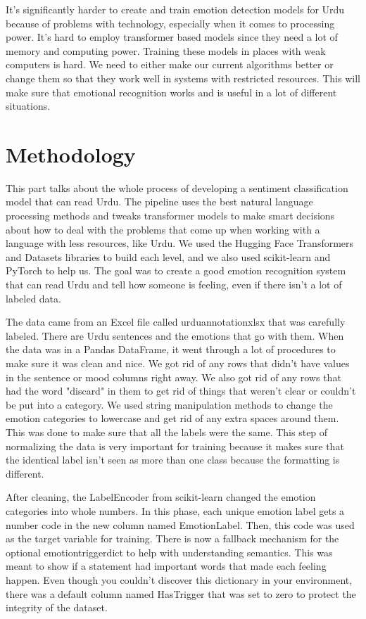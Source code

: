 \documentclass[12pt]{article}
\begin{document}
It's significantly harder to create and train emotion detection models for Urdu because of problems with technology, especially when it comes to processing power. It's hard to employ transformer based models since they need a lot of memory and computing power. Training these models in places with weak computers is hard. We need to either make our current algorithms better or change them so that they work well in systems with restricted resources. This will make sure that emotional recognition works and is useful in a lot of different situations.

\section{Methodology}

This part talks about the whole process of developing a sentiment classification model that can read Urdu. The pipeline uses the best natural language processing methods and tweaks transformer models to make smart decisions about how to deal with the problems that come up when working with a language with less resources, like Urdu. We used the Hugging Face Transformers and Datasets libraries to build each level, and we also used scikit-learn and PyTorch to help us. The goal was to create a good emotion recognition system that can read Urdu and tell how someone is feeling, even if there isn't a lot of labeled data.

The data came from an Excel file called urduannotationxlsx that was carefully labeled. There are Urdu sentences and the emotions that go with them. When the data was in a Pandas DataFrame, it went through a lot of procedures to make sure it was clean and nice. We got rid of any rows that didn't have values in the sentence or mood columns right away. We also got rid of any rows that had the word "discard" in them to get rid of things that weren't clear or couldn't be put into a category. We used string manipulation methods to change the emotion categories to lowercase and get rid of any extra spaces around them. This was done to make sure that all the labels were the same. This step of normalizing the data is very important for training because it makes sure that the identical label isn't seen as more than one class because the formatting is different.

After cleaning, the LabelEncoder from scikit-learn changed the emotion categories into whole numbers. In this phase, each unique emotion label gets a number code in the new column named EmotionLabel. Then, this code was used as the target variable for training. There is now a fallback mechanism for the optional emotiontriggerdict to help with understanding semantics. This was meant to show if a statement had important words that made each feeling happen. Even though you couldn't discover this dictionary in your environment, there was a default column named HasTrigger that was set to zero to protect the integrity of the dataset.
\end{document}

